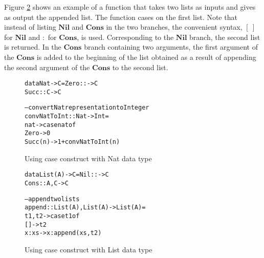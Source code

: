 \documentclass[11pt]{article}
\begin{document}
Figure \ref {seqMPL:caseExampleSecond} shows an example of a function that takes two lists as inputs and gives as output the appended list. The function cases on the first list. Note that instead of listing $\mathbf{Nil}$ and $\mathbf{Cons}$ in the two branches, the convenient syntax, $\mathbf{[~]}$ for $\mathbf{Nil}$ and $\mathbf{:}$ for $\mathbf{Cons}$, is used. Corresponding to the $\mathbf{Nil}$ branch, the second list is returned. In the $\mathbf{Cons}$ branch containing two arguments, the first argument of the $\mathbf{Cons}$ is added to the beginning of the list obtained as a result of appending the second argument of the $\mathbf{Cons}$ to the second list.
\begin{figure}[!h]
\begin{alltt}

              data Nat -> C = Zero ::   -> C 
                              Succ :: C -> C

              -- convert Nat representation to Integer
              convNatToInt :: Nat -> Int =
                nat -> case nat of
                         Zero    -> 0
                         Succ(n) -> 1 + convNatToInt(n) 
\end{alltt} 
\caption{Using case construct with Nat data type}
\label{seqMPL:caseExampleFirst}
\end{figure} 

\begin{figure}[!h]
\begin{alltt}

              data List(A) -> C = Nil  ::     -> C 
                                  Cons :: A,C -> C

              -- append two lists
              append :: List(A),List(A) -> List(A) =
                t1,t2 -> case t1 of
                           []    -> t2
                           x:xs  -> x:append(xs,t2) 
\end{alltt} 
\caption{Using case construct with List data type}
\label{seqMPL:caseExampleSecond}
\end{figure} 
\end{document}
